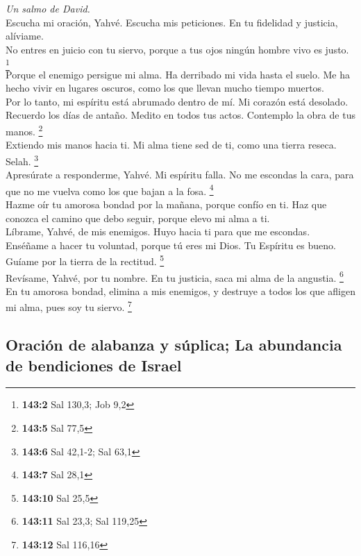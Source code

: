 \emph{Un salmo de David.}\\
 Escucha mi oración, Yahvé. Escucha mis peticiones. En tu
fidelidad y justicia, alíviame.\\
 No entres en juicio con tu siervo, porque a tus ojos
ningún hombre vivo es justo. \footnote{\textbf{143:2} Sal 130,3; Job 9,2}\\
 Porque el enemigo persigue mi alma. Ha derribado mi vida
hasta el suelo. Me ha hecho vivir en lugares oscuros, como los que
llevan mucho tiempo muertos.\\
 Por lo tanto, mi espíritu está abrumado dentro de mí. Mi
corazón está desolado.\\
 Recuerdo los días de antaño. Medito en todos tus actos.
Contemplo la obra de tus manos. \footnote{\textbf{143:5} Sal 77,5}\\
 Extiendo mis manos hacia ti. Mi alma tiene sed de ti,
como una tierra reseca. Selah. \footnote{\textbf{143:6} Sal 42,1-2; Sal
  63,1}\\
 Apresúrate a responderme, Yahvé. Mi espíritu falla. No me
escondas la cara, para que no me vuelva como los que bajan a la fosa.
\footnote{\textbf{143:7} Sal 28,1}\\
 Hazme oír tu amorosa bondad por la mañana, porque confío
en ti. Haz que conozca el camino que debo seguir, porque elevo mi alma a
ti.\\
 Líbrame, Yahvé, de mis enemigos. Huyo hacia ti para que
me escondas.\\
 Enséñame a hacer tu voluntad, porque tú eres mi Dios. Tu
Espíritu es bueno. Guíame por la tierra de la rectitud. \footnote{\textbf{143:10}
  Sal 25,5}\\
 Revísame, Yahvé, por tu nombre. En tu justicia, saca mi
alma de la angustia. \footnote{\textbf{143:11} Sal 23,3; Sal 119,25}\\
 En tu amorosa bondad, elimina a mis enemigos, y destruye
a todos los que afligen mi alma, pues soy tu siervo. \footnote{\textbf{143:12}
  Sal 116,16}

\hypertarget{oraciuxf3n-de-alabanza-y-suxfaplica-la-abundancia-de-bendiciones-de-israel}{%
\subsection{Oración de alabanza y súplica; La abundancia de bendiciones
de
Israel}\label{oraciuxf3n-de-alabanza-y-suxfaplica-la-abundancia-de-bendiciones-de-israel}}

